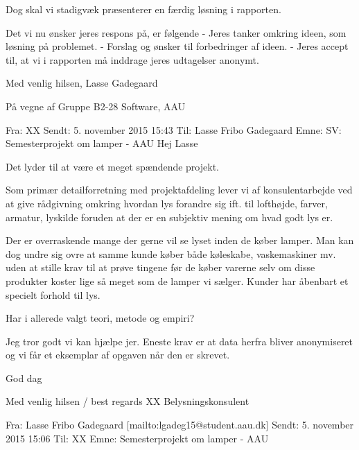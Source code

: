 \documentclass[oneside,a4paper,titlepage]{article}
\begin{document}
Dog skal vi stadigvæk præsenterer en færdig løsning i rapporten. 

Det vi nu ønsker jeres respons på, er følgende
 - Jeres tanker omkring ideen, som løsning på problemet.\newline
 - Forslag og ønsker til forbedringer af ideen. \newline
 - Jeres accept til, at vi i rapporten må inddrage jeres udtagelser anonymt.

Med venlig hilsen,\newline
Lasse Gadegaard
 
På vegne af \newline
Gruppe B2-28\newline
Software, AAU
 
\noindent\makebox[\linewidth]{\rule{\paperwidth}{0.4pt}}

Fra: XX \newline
Sendt: 5. november 2015 15:43\newline
Til: Lasse Fribo Gadegaard\newline
Emne: SV: Semesterprojekt om lamper - AAU\newline
Hej Lasse

Det lyder til at være et meget spændende projekt.
 
Som primær detailforretning med projektafdeling lever vi af konsulentarbejde ved at give rådgivning omkring hvordan lys forandre sig ift. til lofthøjde, farver, armatur, lyskilde foruden at der er en subjektiv mening om hvad godt lys er.

Der er overraskende mange der gerne vil se lyset inden de køber lamper. Man kan dog undre sig ovre at samme kunde køber både køleskabe, vaskemaskiner mv. uden at stille krav til at prøve tingene før de køber varerne selv om disse produkter koster lige så meget som de lamper vi sælger. Kunder har åbenbart et specielt forhold til lys. 

Har i allerede valgt teori, metode og empiri? 

Jeg tror godt vi kan hjælpe jer. Eneste krav er at data herfra bliver anonymiseret og vi får et eksemplar af opgaven når den er skrevet.

God dag

Med venlig hilsen / best regards\newline
XX\newline
Belysningskonsulent

\noindent\makebox[\linewidth]{\rule{\paperwidth}{0.4pt}}

Fra: Lasse Fribo Gadegaard [mailto:lgadeg15@student.aau.dk] \newline
Sendt: 5. november 2015 15:06\newline
Til: XX\newline
Emne: Semesterprojekt om lamper - AAU
 
\end{document}
